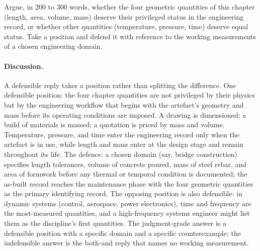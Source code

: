 \begin{exercise}
Argue, in 200 to 300 words, whether the four geometric quantities of
this chapter (length, area, volume, mass) deserve their privileged
status in the engineering record, or whether other quantities
(temperature, pressure, time) deserve equal status. Take a position
and defend it with reference to the working measurements of a chosen
engineering domain.
\end{exercise}

\paragraph{Discussion.}
A defensible reply takes a position rather than splitting the
difference. One defensible position: the four chapter quantities
are not privileged by their physics but by the engineering
workflow that begins with the artefact's geometry and mass
before its operating conditions are imposed. A drawing is
dimensioned; a build of materials is massed; a quotation is
priced by mass and volume. Temperature, pressure, and time enter
the engineering record only when the artefact is in use, while
length and mass enter at the design stage and remain throughout
its life. The defence: a chosen domain (say, bridge construction)
specifies length tolerances, volume of concrete poured, mass of
steel rebar, and area of formwork before any thermal or temporal
condition is documented; the as-built record reaches the
maintenance phase with the four geometric quantities as the
primary identifying record. The opposing position is also
defensible: in dynamic systems (control, aerospace, power
electronics), time and frequency are the most-measured quantities,
and a high-frequency systems engineer might list them as the
discipline's first quantities. The judgment-grade answer is a
defensible position with a specific domain and a specific
counterexample; the indefensible answer is the both-and reply
that names no working measurement.
